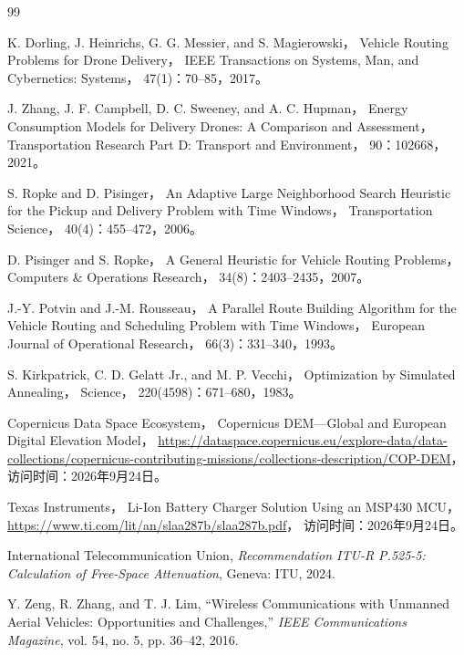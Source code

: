 \begin{thebibliography}{99}
	
	
	K. Dorling, J. Heinrichs, G. G. Messier, and S. Magierowski，
	Vehicle Routing Problems for Drone Delivery，
	IEEE Transactions on Systems, Man, and Cybernetics: Systems，
	47(1)：70--85，2017。
	
	J. Zhang, J. F. Campbell, D. C. Sweeney, and A. C. Hupman，
	Energy Consumption Models for Delivery Drones: A Comparison and Assessment，
	Transportation Research Part D: Transport and Environment，
	90：102668，2021。
	
	S. Ropke and D. Pisinger，
	An Adaptive Large Neighborhood Search Heuristic for the Pickup and Delivery Problem with Time Windows，
	Transportation Science，
	40(4)：455--472，2006。
	
	D. Pisinger and S. Ropke，
	A General Heuristic for Vehicle Routing Problems，
	Computers \& Operations Research，
	34(8)：2403--2435，2007。
	
	J.-Y. Potvin and J.-M. Rousseau，
	A Parallel Route Building Algorithm for the Vehicle Routing and Scheduling Problem with Time Windows，
	European Journal of Operational Research，
	66(3)：331--340，1993。
	
	S. Kirkpatrick, C. D. Gelatt Jr., and M. P. Vecchi，
	Optimization by Simulated Annealing，
	Science，
	220(4598)：671--680，1983。
	
	Copernicus Data Space Ecosystem，
	Copernicus DEM---Global and European Digital Elevation Model，
	\url{https://dataspace.copernicus.eu/explore-data/data-collections/copernicus-contributing-missions/collections-description/COP-DEM}，
	访问时间：2026年9月24日。
	
	Texas Instruments，
	Li-Ion Battery Charger Solution Using an MSP430 MCU，
	\url{https://www.ti.com/lit/an/slaa287b/slaa287b.pdf}，
	访问时间：2026年9月24日。
	
	International Telecommunication Union,
	\emph{Recommendation ITU-R P.525-5: Calculation of Free-Space Attenuation},
	Geneva: ITU, 2024.
	
	Y. Zeng, R. Zhang, and T. J. Lim,
	``Wireless Communications with Unmanned Aerial Vehicles: Opportunities and Challenges,''
	\emph{IEEE Communications Magazine},
	vol. 54, no. 5, pp. 36--42, 2016.
	

\end{thebibliography}
